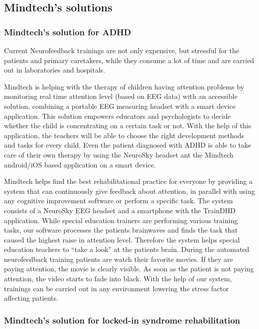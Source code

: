 \documentclass[letterpaper,10pt]{article}
\let\oldsubsection\subsection
\renewcommand{\subsection}{\def\cursectioning{subsection}\oldsubsection}
\begin{document}
\subsection{Mindtech's solutions}

\subsubsection{Mindtech's solution for ADHD}

Current Neurofeedback trainings are not only expensive, but stressful for the patients and primary caretakers, while they consume a lot of time and are carried out in laboratories and hospitals.

Mindtech is helping with the therapy of children having attention problems by monitoring real time attention level (based on EEG data) with an accessible solution, combining a portable EEG measuring headset with a smart device application. This solution empowers  educators and psychologists to decide whether the child  is concentrating on a certain task or not. With the help of this application, the teachers will be able to choose the right development methods and tasks for every child. Even the  patient diagnosed with ADHD is able to take care of their own therapy by using the NeuroSky headset ant the Mindtech  android/iOS based application on a smart device.

Mindtech helps find the best rehabilitational practice for everyone by providing a system that can continuously give feedback about attention, in parallel with using any cognitive improvement software or perform a specific task. The system consists of a NeuroSky EEG headset and a smartphone with the TrainDHD application.  While special education trainers are performing various training tasks, our software processes the patients brainwaves and finds the task that caused the highest raise in attention level. Therefore the system helps special education teachers to “take a look” at the patients brain.
During the automated neurofeedback training patients are watch their favorite movies. If they are paying attention, the movie is clearly visible. As soon as the patient is not paying attention, the video starts to fade into black. With the help of our system, trainings can be carried out in any environment lowering the stress factor affecting patients. 


\subsubsection{Mindtech's solution for locked-in syndrome rehabilitation}
\end{document}
